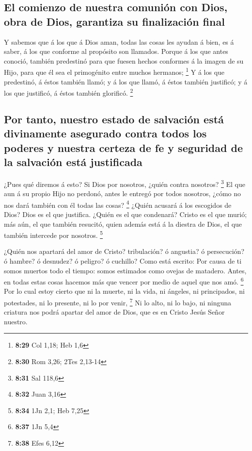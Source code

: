 \hypertarget{el-comienzo-de-nuestra-comuniuxf3n-con-dios-obra-de-dios-garantiza-su-finalizaciuxf3n-final}{%
\subsection{El comienzo de nuestra comunión con Dios, obra de Dios,
garantiza su finalización
final}\label{el-comienzo-de-nuestra-comuniuxf3n-con-dios-obra-de-dios-garantiza-su-finalizaciuxf3n-final}}

 Y sabemos que á los que á Dios aman, todas las cosas les
ayudan á bien, es á saber, á los que conforme al propósito son llamados.
 Porque á los que antes conoció, también predestinó para
que fuesen hechos conformes á la imagen de su Hijo, para que él sea el
primogénito entre muchos hermanos; \footnote{\textbf{8:29} Col 1,18; Heb
  1,6}  Y á los que predestinó, á éstos también llamó; y á
los que llamó, á éstos también justificó; y á los que justificó, á éstos
también glorificó. \footnote{\textbf{8:30} Rom 3,26; 2Tes 2,13-14}

\hypertarget{por-tanto-nuestro-estado-de-salvaciuxf3n-estuxe1-divinamente-asegurado-contra-todos-los-poderes-y-nuestra-certeza-de-fe-y-seguridad-de-la-salvaciuxf3n-estuxe1-justificada}{%
\subsection{Por tanto, nuestro estado de salvación está divinamente
asegurado contra todos los poderes y nuestra certeza de fe y seguridad
de la salvación está
justificada}\label{por-tanto-nuestro-estado-de-salvaciuxf3n-estuxe1-divinamente-asegurado-contra-todos-los-poderes-y-nuestra-certeza-de-fe-y-seguridad-de-la-salvaciuxf3n-estuxe1-justificada}}

 ¿Pues qué diremos á esto? Si Dios por nosotros, ¿quién
contra nosotros? \footnote{\textbf{8:31} Sal 118,6}  El que
aun á su propio Hijo no perdonó, antes le entregó por todos nosotros,
¿cómo no nos dará también con él todas las cosas? \footnote{\textbf{8:32}
  Juan 3,16}  ¿Quién acusará á los escogidos de Dios? Dios
es el que justifica.  ¿Quién es el que condenará? Cristo es
el que murió; más aún, el que también resucitó, quien además está á la
diestra de Dios, el que también intercede por nosotros. \footnote{\textbf{8:34}
  1Jn 2,1; Heb 7,25}

 ¿Quién nos apartará del amor de Cristo? tribulación? ó
angustia? ó persecución? ó hambre? ó desnudez? ó peligro? ó cuchillo?
 Como está escrito: Por causa de ti somos muertos todo el
tiempo: somos estimados como ovejas de matadero.  Antes, en
todas estas cosas hacemos más que vencer por medio de aquel que nos amó.
\footnote{\textbf{8:37} 1Jn 5,4}  Por lo cual estoy cierto
que ni la muerte, ni la vida, ni ángeles, ni principados, ni potestades,
ni lo presente, ni lo por venir, \footnote{\textbf{8:38} Efes 6,12}
 Ni lo alto, ni lo bajo, ni ninguna criatura nos podrá
apartar del amor de Dios, que es en Cristo Jesús Señor nuestro.

